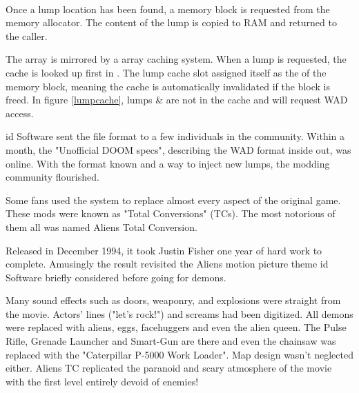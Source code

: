 \par
{}\\
\par
Once a lump location has been found, a memory block is requested from the memory allocator. The content of the lump is copied to RAM and returned to the caller. \\
\par
The  array is mirrored by a  array caching system. When a lump is requested, the cache is looked up first in . The lump cache slot assigned itself as the  of the memory block, meaning the cache is automatically invalidated if the block is freed. In figure \ref{lumpcache}, lumps  \&  are not in the cache and will request WAD access.\\
\par
{}
\par
{}
\pagebreak

id Software sent the file format to a few individuals in the community. Within a month, the "Unofficial DOOM specs", describing the WAD format inside out, was online. With the format known and a way to inject new lumps, the modding community flourished.\\
\par

Some fans used the system to replace almost every aspect of the original game. These mods were known as "Total Conversions" (TCs). The most notorious of them all was named Aliens Total Conversion.\\
\par
Released in December 1994, it took Justin Fisher one year of hard work to complete. Amusingly the result revisited the Aliens motion picture theme id Software briefly considered before going for demons.\\
\par
 \par
 Many sound effects such as doors, weaponry, and explosions were straight from the movie. Actors' lines ("let's rock!") and screams had been digitized. All demons were replaced with aliens, eggs, facehuggers and even the alien queen. The Pulse Rifle, Grenade Launcher and Smart-Gun are there and even the chainsaw was replaced with the "Caterpillar P-5000 Work Loader". Map design wasn't neglected either. Aliens TC replicated the paranoid and scary atmosphere of the movie with the first level entirely devoid of enemies!

